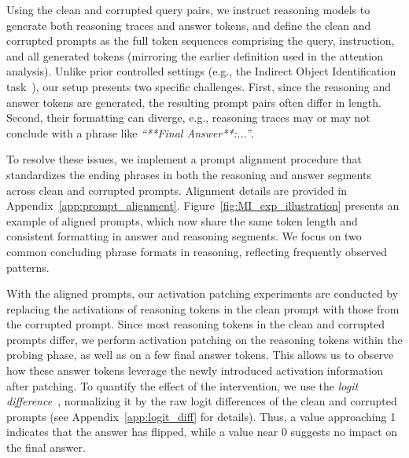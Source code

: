 \documentclass[11pt]{article}
\begin{document}
Using the clean and corrupted query pairs, we instruct reasoning models to generate both reasoning traces and answer tokens, and define the clean and corrupted prompts as the full token sequences comprising the query, instruction, and all generated tokens (mirroring the earlier definition used in the attention analysis). Unlike prior controlled settings (e.g., the Indirect Object Identification task~\cite{2022arXiv221100593W}), our setup presents two specific challenges. First, since the reasoning and answer tokens are generated, the resulting prompt pairs often differ in length. Second, their formatting can diverge, e.g., reasoning traces may or may not conclude with a phrase like \textit{“**Final Answer**:...”}. 

To resolve these issues, we implement a prompt alignment procedure that standardizes the ending phrases in both the reasoning and answer segments across clean and corrupted prompts. Alignment details are provided in Appendix~\ref{app:prompt_alignment}. Figure~\ref{fig:MI_exp_illustration} presents an example of aligned prompts, which now share the same token length and consistent formatting in answer and reasoning segments. We focus on two common concluding phrase formats in reasoning, reflecting frequently observed patterns.





With the aligned prompts, our activation patching experiments are conducted by replacing the activations of reasoning tokens in the clean prompt with those from the corrupted prompt. Since most reasoning tokens in the clean and corrupted prompts differ, we perform activation patching on the reasoning tokens within the probing phase, as well as on a few final answer tokens. This allows us to observe how these answer tokens leverage the newly introduced activation information after patching. To quantify the effect of the intervention, we use the \textit{logit difference}~\cite{heimersheim2024useinterpretactivationpatching}, normalizing it by the raw logit differences of the clean and corrupted prompts (see Appendix~\ref{app:logit_diff} for details). Thus, a value approaching 1 indicates that the answer has flipped, while a value near 0 suggests no impact on the final answer.
\end{document}
